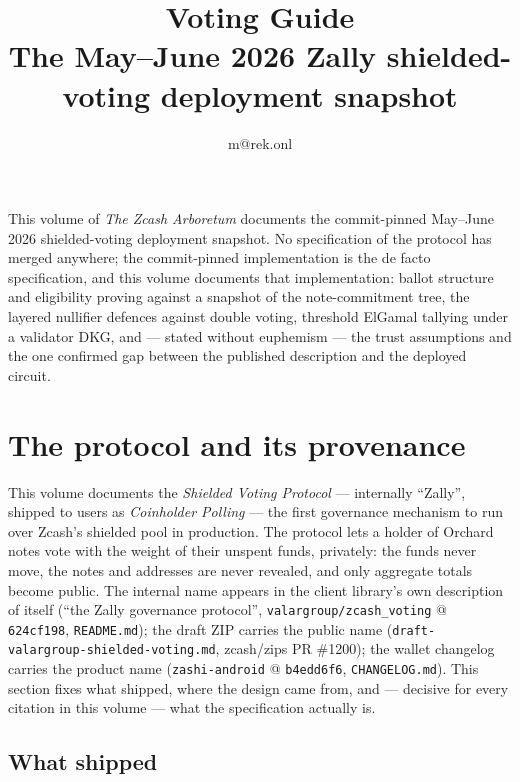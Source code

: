 \documentclass[11pt,a4paper]{article}
\title{\textbf{\Huge Voting Guide}\\[6pt]\large The May--June 2026 Zally shielded-voting deployment snapshot}
\author{m@rek.onl}
\date{}
\theoremstyle{definition}
\renewenvironment{abstract}{%
  \small\begin{center}{\bfseries\abstractname}\end{center}\medskip\noindent\ignorespaces
}{\par\medskip}
\begin{document}
\maketitle
\thispagestyle{empty}
\begin{abstract}
This volume of \emph{The Zcash Arboretum} documents the commit-pinned
May--June 2026 shielded-voting deployment snapshot. No specification of the
protocol has merged anywhere; the commit-pinned implementation is the de facto
specification, and this volume documents that implementation: ballot structure
and eligibility proving against a snapshot of the note-commitment tree, the
layered nullifier defences against double voting, threshold ElGamal tallying
under a validator DKG, and --- stated without euphemism --- the trust
assumptions and the one confirmed gap between the published description and
the deployed circuit.
\end{abstract}
\clearpage
\tableofcontents
\clearpage
\section{The protocol and its provenance}\label{sec:vote-context}

This volume documents the \emph{Shielded Voting Protocol} --- internally
``Zally'', shipped to users as \emph{Coinholder Polling} --- the first
governance mechanism to run over Zcash's shielded pool in production. The
protocol lets a holder of Orchard notes vote with the weight of their unspent
funds, privately: the funds never move, the notes and addresses are never
revealed, and only aggregate totals become public. The internal name appears
in the client library's own description of itself (``the Zally governance
protocol'', \texttt{valargroup/zcash\_voting} @ \texttt{624cf198},
\texttt{README.md}); the draft ZIP carries the public name
(\texttt{draft-valargroup-shielded-voting.md}, zcash/zips PR \#1200); the
wallet changelog carries the product name (\texttt{zashi-android} @
\texttt{b4edd6f6}, \texttt{CHANGELOG.md}). This section fixes what shipped,
where the design came from, and --- decisive for every citation in this
volume --- what the specification actually is.

\subsection{What shipped}\label{sec:vote-shipped}
\end{document}
